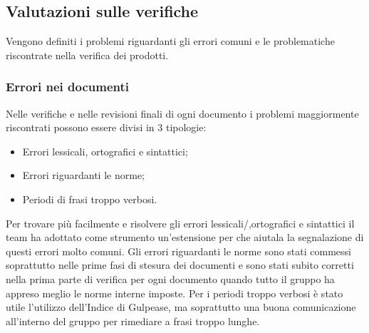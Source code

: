 \documentclass[../piano-di-qualifica.tex]{subfiles}
\begin{document}
\subsection{Valutazioni sulle verifiche}
\label{sub:valutazioni_verifiche}
Vengono definiti i problemi riguardanti gli errori comuni e le problematiche riscontrate nella verifica dei prodotti.

\subsubsection{Errori nei documenti}
\label{sub:errori_documenti}
Nelle verifiche e nelle revisioni finali di ogni documento i problemi maggiormente riscontrati possono essere divisi in 3 tipologie:
\begin{itemize}
    \item Errori lessicali, ortografici e sintattici;
    \item Errori riguardanti le norme;
    \item Periodi di frasi troppo verbosi.
\end{itemize}
Per trovare più facilmente e risolvere gli errori lessicali/,ortografici e sintattici il team ha adottato come strumento un'estensione per  che aiutala la segnalazione di questi errori molto comuni.
Gli errori riguardanti le norme sono stati commessi soprattutto nelle prime fasi di stesura dei documenti e sono stati subito corretti nella prima parte di verifica per ogni documento quando tutto il gruppo ha appreso meglio le norme interne imposte.
Per i periodi troppo verbosi è stato utile l'utilizzo dell'Indice di Gulpease, ma soprattutto una buona comunicazione all'interno del gruppo per rimediare a frasi troppo lunghe.
\end{document}
